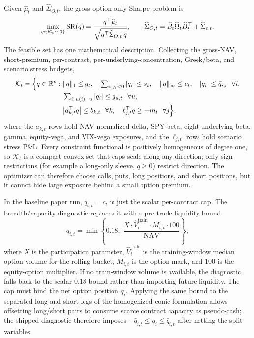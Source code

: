 Given \(\widehat\mu_t\) and \(\widehat\Sigma_{O,t}\), the gross option-only Sharpe problem
is
\[
  \max_{q\in\mathcal K_t\setminus\{0\}}
  \operatorname{SR}(q)=\frac{q^\top\widehat\mu_t}{\sqrt{q^\top\widehat\Sigma_{O,t}\,q}},
  \qquad
  \widehat\Sigma_{O,t}
  =\widehat B_t\widehat\Omega_t\widehat B_t^\top+\widehat\Sigma_{\varepsilon,t}.
\]
The feasible set has one mathematical description. Collecting the gross-NAV, short-premium,
per-contract, per-underlying-concentration, Greek/beta, and scenario stress budgets,
\[
\begin{aligned}
\mathcal K_t=\Bigl\{q\in\mathbb{R}^n:\;
  &\|q\|_1\le g_t,\quad
  \textstyle\sum_{i:\,q_i<0}|q_i|\le s_t,\quad
  \|q\|_\infty\le c_t,\quad |q_i|\le \bar q_{i,t}\ \ \forall i,\\
  &\textstyle\sum_{i:\,u(i)=u}|q_i|\le g_{u,t}\ \ \forall u,\\
  &\bigl|a_{k,t}^\top q\bigr|\le b_{k,t}\ \ \forall k,\quad
  \ell_{j,t}^\top q\ge-m_t\ \ \forall j
  \Bigr\},
\end{aligned}
\]
where the \(a_{k,t}\) rows hold NAV-normalized delta, SPY-beta, eight-underlying-beta,
gamma, equity-vega, and VIX-vega exposures, and the \(\ell_{j,t}\) rows hold scenario
stress P\&L. Every constraint functional is positively homogeneous of degree one, so
\(\mathcal K_t\) is a compact convex set that caps scale along any direction; only sign
restrictions (for example a long-only sleeve, \(q\ge0\)) restrict direction. The optimizer
can therefore choose calls, puts, long positions, and short positions, but it cannot hide
large exposure behind a small option premium.

In the baseline paper run, \(\bar q_{i,t}=c_t\) is just the scalar per-contract cap. The
breadth/capacity diagnostic replaces it with a pre-trade liquidity bound
\[
  \bar q_{i,t}=\min\!\left\{0.18,\;
  \frac{X\cdot \widehat V^{\mathrm{train}}_{i}\cdot M_{i,t}\cdot 100}{\mathrm{NAV}}
  \right\},
\]
where \(X\) is the participation parameter, \(\widehat V^{\mathrm{train}}_{i}\) is the
training-window median option volume for the rolling bucket, \(M_{i,t}\) is the option
mark, and \(100\) is the equity-option multiplier. If no train-window volume is available,
the diagnostic falls back to the scalar \(0.18\) bound rather than importing future
liquidity. The cap must bind the net option position \(q_i\). Applying the same bound to
the separated long and short legs of the homogenized conic formulation allows offsetting
long/short pairs to consume scarce contract capacity as pseudo-cash; the shipped
diagnostic therefore imposes \(-\bar q_{i,t}\le q_i\le \bar q_{i,t}\) after netting the
split variables.

